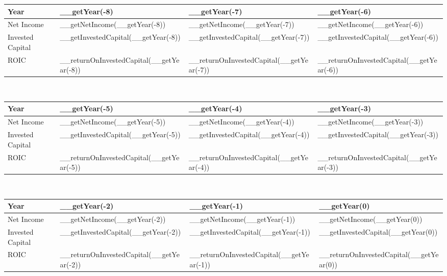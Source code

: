 \begin{tabularx}{\textwidth}{|X|X|X|X|}
 \hline
 Year                      & __getYear(-8)                            & __getYear(-7)                            & __getYear(-6)                            \\
 \hline
 Net Income                & __getNetIncome(__getYear(-8))            & __getNetIncome(__getYear(-7))            & __getNetIncome(__getYear(-6))            \\
 Invested Capital          & __getInvestedCapital(__getYear(-8))      & __getInvestedCapital(__getYear(-7))      & __getInvestedCapital(__getYear(-6))      \\
 \rowcolor{lightgray} ROIC & __returnOnInvestedCapital(__getYear(-8)) & __returnOnInvestedCapital(__getYear(-7)) & __returnOnInvestedCapital(__getYear(-6)) \\
 \hline
\end{tabularx}\\

\begin{tabularx}{\textwidth}{|X|X|X|X|}
 \hline
 Year                      & __getYear(-5)                            & __getYear(-4)                            & __getYear(-3)                            \\
 \hline
 Net Income                & __getNetIncome(__getYear(-5))            & __getNetIncome(__getYear(-4))            & __getNetIncome(__getYear(-3))            \\
 Invested Capital          & __getInvestedCapital(__getYear(-5))      & __getInvestedCapital(__getYear(-4))      & __getInvestedCapital(__getYear(-3))      \\
 \rowcolor{lightgray} ROIC & __returnOnInvestedCapital(__getYear(-5)) & __returnOnInvestedCapital(__getYear(-4)) & __returnOnInvestedCapital(__getYear(-3)) \\
 \hline
\end{tabularx}\\

\begin{tabularx}{\textwidth}{|X|X|X|X|}
 \hline
 Year                      & __getYear(-2)                            & __getYear(-1)                            & __getYear(0)                            \\
 \hline
 Net Income                & __getNetIncome(__getYear(-2))            & __getNetIncome(__getYear(-1))            & __getNetIncome(__getYear(0))            \\
 Invested Capital          & __getInvestedCapital(__getYear(-2))      & __getInvestedCapital(__getYear(-1))      & __getInvestedCapital(__getYear(0))      \\
 \rowcolor{lightgray} ROIC & __returnOnInvestedCapital(__getYear(-2)) & __returnOnInvestedCapital(__getYear(-1)) & __returnOnInvestedCapital(__getYear(0)) \\
 \hline
\end{tabularx}

